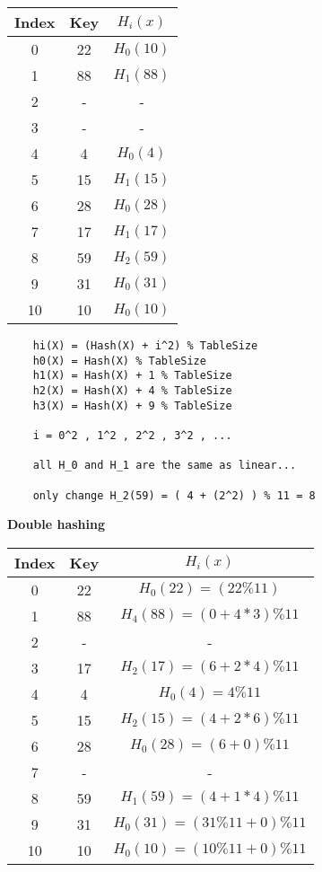\documentclass[11pt]{article}
\begin{document}
\begin{center}
\begin{tabular}{|c c c |} 
 \hline
 Index & Key & $H_i(x)$ \\ 
 \hline\hline
 0 & 22 &  $H_0(10)$ \\ 
\hline
 1 & 88 & $H_1(88)$ \\ 
 \hline
 2 & - & -  \\ 
 \hline
 3 & - & -  \\ 
 \hline
 4 & 4 & $H_0(4)$  \\ 
 \hline
 5 & 15 & $H_1(15)$  \\
  \hline
6 & 28 & $H_0(28)$  \\ 
 \hline
 7 & 17 & $H_1(17)$  \\ 
 \hline
 8 & 59 & $H_2(59)$   \\ 
 \hline
 9 & 31 & $H_0(31)$  \\
  \hline
10 & 10 & $H_0(10)$  \\
  \hline
\end{tabular}
\end{center}
\begin{verbatim}
    hi(X) = (Hash(X) + i^2) % TableSize
    h0(X) = Hash(X) % TableSize
    h1(X) = Hash(X) + 1 % TableSize
    h2(X) = Hash(X) + 4 % TableSize
    h3(X) = Hash(X) + 9 % TableSize

    i = 0^2 , 1^2 , 2^2 , 3^2 , ... 

    all H_0 and H_1 are the same as linear...

    only change H_2(59) = ( 4 + (2^2) ) % 11 = 8 

\end{verbatim}
\bigskip
\textbf{Double hashing}
\begin{center}
\begin{tabular}{|c c c |} 
 \hline
 Index & Key & $H_i(x)$ \\ 
 \hline\hline
 0 &  22 &  $H_0(22)= (22\%11)$ \\ 
\hline
 1 & 88 & $H_4(88)= ( 0+ 4 * 3 )\%11$ \\ 
 \hline
 2 & - & -  \\ 
 \hline
 3 & 17 & $H_2(17)= (6 + 2 * 4)\%11$  \\ 
 \hline
 4 & 4 & $H_0(4)= 4\%11$  \\ 
 \hline
 5 & 15 &  $H_2(15)= (4 + 2*6)\%11$  \\
  \hline
6 &28 &  $H_0(28)=(6+ 0 )\%11$ \\ 
 \hline
 7 & - & -  \\ 
 \hline
 8 & 59 & $H_1(59)= (4 + 1 * 4)\%11$   \\ 
 \hline
 9 & 31 & $H_0(31)= (31\%11 + 0)\%11$ \\
  \hline
10 & 10 & $H_0(10)= (10\%11 + 0)\%11$  \\
  \hline
\end{tabular}
\end{center}
\end{document}
